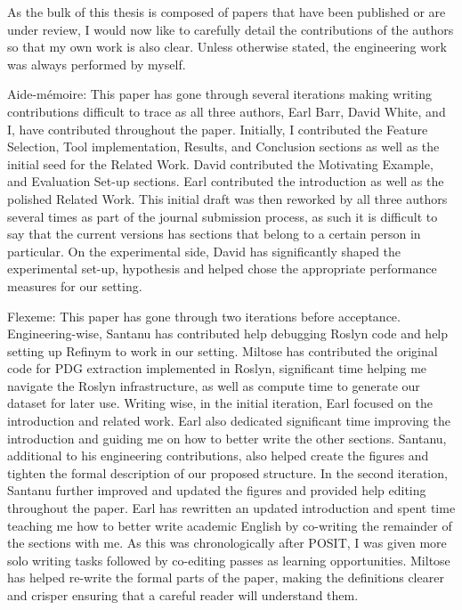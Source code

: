 \begin{acknowledgements}

As the bulk of this thesis is composed of papers that have been published or are
under review, I would now like to carefully detail the contributions of the
authors so that my own work is also clear. Unless otherwise stated, the
engineering work was always performed by myself.

Aide-m\'emoire: This paper has gone through several iterations making writing
contributions difficult to trace as all three authors, Earl Barr, David White,
and I, have contributed throughout the paper. Initially, I contributed the
Feature Selection, Tool implementation, Results, and Conclusion sections as well
as the initial seed for the Related Work. David contributed the Motivating
Example, and Evaluation Set-up sections. Earl contributed the introduction as
well as the polished Related Work. This initial draft was then reworked by all
three authors several times as part of the journal submission process, as such
it is difficult to say that the current versions has sections that belong to a
certain person in particular. On the experimental side, David has significantly
shaped the experimental set-up, hypothesis and helped chose the appropriate
performance measures for our setting.

Flexeme: This paper has gone through two iterations before acceptance.
Engineering-wise, Santanu has contributed help debugging Roslyn code and help
setting up Refinym to work in our setting. Miltose has contributed the original
code for PDG extraction implemented in Roslyn, significant time helping me
navigate the Roslyn infrastructure, as well as compute time to generate our
dataset for later use. Writing wise, in the initial iteration, Earl focused on
the introduction and related work. Earl also dedicated significant time
improving the introduction and guiding me on how to better write the other
sections. Santanu, additional to his engineering contributions, also helped
create the figures and tighten the formal description of our proposed structure.
In the second iteration, Santanu further improved and updated the figures and
provided help editing throughout the paper. Earl has rewritten an updated
introduction and spent time teaching me how to better write academic English by
co-writing the remainder of the sections with me. As this was chronologically
after POSIT, I was given more solo writing tasks followed by co-editing passes
as learning opportunities. Miltose has helped re-write the formal parts of the
paper, making the definitions clearer and crisper ensuring that a careful reader
will understand them.


\end{acknowledgements}
